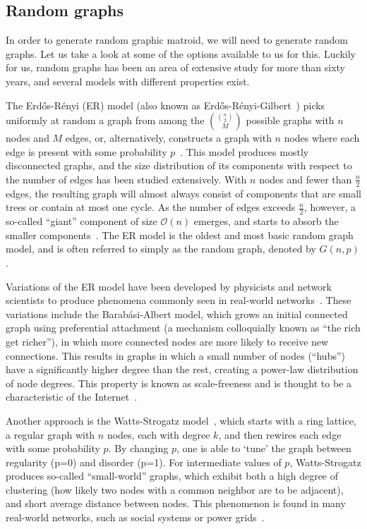 \subsection{Random graphs}
In order to generate random graphic matroid, we will need to generate random graphs. Let us take a look at some of the options available to us for this. Luckily for us, random graphs has been an area of extensive study for more than sixty years, and several models with different properties exist.

The Erdős-Rényi (ER) model (also known as Erdős-Rényi-Gilbert~\cite{fienberg-2012}) picks uniformly at random a graph from among the $\binom{\binom{n}{2}}{M}$ possible graphs with $n$ nodes and $M$ edges, or, alternatively, constructs a graph with $n$ nodes where each edge is present with some probability $p$~\cite{erdos-1959, gilbert-1959}. This model produces mostly disconnected graphs, and the size distribution of its components with respect to the number of edges has been studied extensively. With $n$ nodes and fewer than $\frac{n}{2}$ edges, the resulting graph will almost always consist of components that are small trees or contain at most one cycle. As the number of edges exceeds $\frac{n}{2}$, however, a so-called ``giant'' component of size $\mathcal{O}(n)$ emerges, and starts to absorb the smaller components~\cite{janson1993birth}. The ER model is the oldest and most basic random graph model, and is often referred to simply as the random graph, denoted by $G(n,p)$.

Variations of the ER model have been developed by physicists and network scientists to produce phenomena commonly seen in real-world networks~\cite{fienberg-2012}. These variations include the Barabási-Albert model, which grows an initial connected graph using preferential attachment (a mechanism colloquially known as ``the rich get richer''), in which more connected nodes are more likely to receive new connections. This results in graphs in which a small number of nodes (``hubs'') have a significantly higher degree than the rest, creating a power-law distribution of node degrees. This property is known as scale-freeness and is thought to be a characteristic of the Internet~\cite{barabasi-albert}. 

Another approach is the Watts-Strogatz model~\cite{Watts-1998}, which starts with a ring lattice, a regular graph with $n$ nodes, each with degree $k$, and then rewires each edge with some probability $p$. By changing $p$, one is able to `tune' the graph between regularity (p=0) and disorder (p=1). For intermediate values of $p$, Watts-Strogatz produces so-called ``small-world'' graphs, which exhibit both a high degree of clustering (how likely two nodes with a common neighbor are to be adjacent), and short average distance between nodes. This phenomenon is found in many real-world networks, such as social systems or power grids~\cite{fienberg-2012}.

